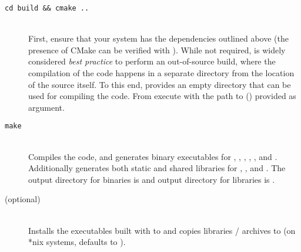 \documentclass[11pt]{article}
\begin{document}
\begin{description}
  \item[{\tt cd build \&\& cmake ..}] \hfill \\
  First, ensure that your system has the dependencies outlined above (the presence of CMake can be verified with ). While not required, is widely considered {\em best practice} to perform an out-of-source build, where the compilation of the code happens in a separate directory from the location of the source itself. To this end, \hermes provides an empty  directory that can be used for compiling the code. From  execute  with the path to  () provided as argument.
  \item[{\tt make}] \hfill \\
  Compiles the code, and generates binary executables for \fft, \rnamfpt, \rnaeq, \fftmfpt, \ffteq, and \rateeq. Additionally generates both static and shared libraries for \fft, \rnamfpt, and \rnaeq. The output directory for binaries is  and output directory for libraries is .
  \item[ \textnormal{(optional)}] \hfill \\
  Installs the executables built with  to  and copies libraries / archives to  (on *nix systems,  defaults to ).
\end{description}

\end{document}
